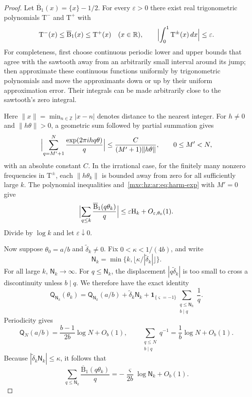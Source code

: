 \documentclass[11pt]{article}
\numberwithin{equation}{section}
\theoremstyle{definition}
\theoremstyle{remark}
\begin{document}
\begin{proof}
Let $\overline{\mathrm B}_1(x)=\{x\}-1/2$. For every $\varepsilon>0$
there exist real trigonometric polynomials $\mathrm T^-$ and $\mathrm T^+$
with
\[
 \mathrm T^-(x)\le\overline{\mathrm B}_1(x)\le\mathrm T^+(x)\quad(x\in\mathbb R),\qquad
 \Bigl|\int_0^1\mathrm T^{\pm}(x)\,dx\Bigr|\le\varepsilon.
\]
For completeness, first choose continuous periodic lower and upper bounds
that agree with the sawtooth away from an arbitrarily small interval around
its jump; then approximate these continuous functions uniformly by
trigonometric polynomials and move the approximants down or up by their
uniform approximation error. Their integrals can be made arbitrarily close
to the sawtooth's zero integral.

Here $\|x\|=\min_{n\in\mathbb Z}|x-n|$ denotes distance to the nearest
integer. For $h\ne0$ and $\|h\theta\|>0$, a geometric sum followed by
partial summation gives
\begin{equation}\label{mxc:hz:ar:eq:harm-exp}
 \Bigl|\sum_{q=M'+1}^{N}\frac{\exp(2\pi i hq\theta)}q\Bigr|
 \le\frac{C}{(M'+1)\|h\theta\|},\qquad 0\le M'<N,
\end{equation}
with an absolute constant $C$. In the irrational case, for the finitely
many nonzero frequencies in $\mathrm T^{\pm}$, each $\|h\theta_k\|$ is
bounded away from zero for all sufficiently large $k$. The polynomial
inequalities and~\eqref{mxc:hz:ar:eq:harm-exp} with $M'=0$ give
\[
 \Bigl|\sum_{q\le k}\frac{\overline{\mathrm B}_1(q\theta_k)}q\Bigr|
 \le\varepsilon \mathrm H_k+O_{\varepsilon,\theta_0}(1).
\]
Divide by $\log k$ and let $\varepsilon\downarrow0$.

Now suppose $\theta_0=a/b$ and $\widetilde\delta_k\ne0$. Fix
$0<\kappa<1/(4b)$, and write
\[
 \mathsf N_k=\min\{k,\lfloor \kappa/|\widetilde\delta_k|\rfloor\}.
\]
For all large $k$, $\mathsf N_k\to\infty$. For $q\le\mathsf N_k$, the
displacement $|q\widetilde\delta_k|$ is too small to cross a discontinuity
unless $b\mid q$. We therefore have the exact identity
\[
 \mathsf Q_{\mathsf N_k}(\theta_k)
 =\mathsf Q_{\mathsf N_k}(a/b)+\widetilde\delta_k\mathsf N_k
   +\mathbf 1_{\{\varsigma=-1\}}
       \sum_{\substack{q\le\mathsf N_k\\b\mid q}}\frac1q.
\]
Periodicity gives
\[
 \mathsf Q_N(a/b)=\frac{b-1}{2b}\log N+O_b(1),\qquad
 \sum_{\substack{q\le N\\b\mid q}}q^{-1}=\frac1b\log N+O_b(1).
\]
Because $|\widetilde\delta_k\mathsf N_k|\le\kappa$, it follows that
\begin{equation}\label{mxc:hz:ar:eq:low-harmonic}
 \sum_{q\le\mathsf N_k}\frac{\overline{\mathrm B}_1(q\theta_k)}q
 =-\frac{\varsigma}{2b}\log\mathsf N_k+O_b(1).
\end{equation}


\end{proof}
\end{document}
